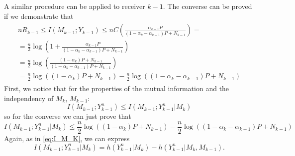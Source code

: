 A similar procedure can be applied to receiver $k-1$. The converse can be proved if we demonstrate that
\begin{align}
  \begin{split}
    nR_{k-1}\leq I(M_{k-1};Y_{k-1})\leq nC\left(\frac{\alpha_{k-1} P}{\left(1-\alpha_k-\alpha_{k-1}\right)P + N_{k-1}}\right) = \\
    = \frac{n}{2}\log\left(1+\frac{\alpha_{k-1} P}{\left(1-\alpha_k-\alpha_{k-1}\right)P + N_{k-1}}\right)\\
    = \frac{n}{2}\log\left(\frac{(1-\alpha_{k})P+N_{k-1} }{\left(1-\alpha_k-\alpha_{k-1}\right)P + N_{k-1}}\right)\\
    = \frac{n}{2}\log\left((1-\alpha_{k})P+N_{k-1}\right)-\frac{n}{2}\log\left(\left(1-\alpha_k-\alpha_{k-1}\right)P + N_{k-1}\right)
  \end{split}
\end{align}
First, we notice that for the properties of the mutual information and the independency of $M_k$, $M_{k-1}$:
\begin{equation}
  I(M_{k-1};Y^n_{k-1})\leq I(M_{k-1};Y^n_{k-1}|M_k)
\end{equation}
so for the converse we can just prove that
\begin{equation}
  I(M_{k-1};Y^n_{k-1}|M_k)\leq \frac{n}{2}\log\left((1-\alpha_{k})P+N_{k-1}\right)-\frac{n}{2}\log\left(\left(1-\alpha_k-\alpha_{k-1}\right)P + N_{k-1}\right)
  \label{eq:I_M-1_K-1}
\end{equation}
Again, as in \ref{eq:I_M_K}, we can express
\begin{equation}
  I(M_{k-1};Y^n_{k-1}|M_k) = h(Y_{k-1}^n|M_{k}) - h(Y_{k-1}^n|M_k,M_{k-1}).
  \label{eq:I_M_K-1_I_K-1|Mk}
\end{equation}
